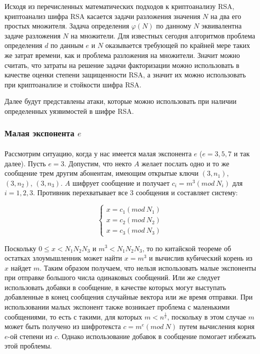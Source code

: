   Исходя из перечисленных математических подходов к криптоанализу RSA, криптоанализ шифра RSA касается задачи разложения значения $N$ на два его простых множителя. 
  Задача определения $\varphi(N)$ по данному $N$ эквивалентна задаче разложения $N$ на множители. Для известных сегодня алгоритмов
  проблема определения $d$ по данным $e$ и $N$ оказывается требующей по крайней мере таких же затрат времени, как и проблема разложения на 
  множители. Значит можно считать, что затраты на решение задачи факторизации можно использовать в качестве оценки степени защищенности RSA, а значит их можно использовать 
  при криптоанализе и стойкости шифра RSA.

  Далее будут представлены атаки, которые можно использовать при наличии определенных уязвимостей в шифре RSA. 

\subsubsection{Малая экспонента $e$}

  \paragraph{} Рассмотрим ситуацию, когда у нас имеется малая экспонента $e$ ($e = 3,5,7$ и так далее). Пусть $e=3$. Допустим, что некто
  $A$ желает послать одно и то же сообщение трем другим абонентам, имеющим открытые ключи $(3, n_1)$, $(3, n_2)$, $(3, n_3)$. $A$ шифрует 
  сообщение и получает $c_i = m^3(mod \: N_i)$ для $i = 1, 2, 3$. Противник перехватывает все 3 сообщения и составляет систему:
  
    \begin{equation}
    	\begin{cases}
    	   x = c_1(mod \: N_1) \\
    	   x = c_2(mod \: N_2) \\
    	   x = c_3(mod \: N_3)
    	\end{cases}    
    \end{equation}

  Поскольку $0 \le x < N_1 N_2 N_3$ и $m^3 < N_1 N_2 N_3$, то по китайской теореме об остатках злоумышленник может найти 
  $x = m^3$ и вычислив кубический корень из $x$ найдет $m$. Таким образом получаем, что нельзя использовать малые экспоненты 
  при отправке большого числа одинаковых сообщений. Или же следует использовать добавки в сообщение, в качестве которых могут выступать добавленные в 
  конец сообщения случайные вектора или же время отправки. При использовании малых экспонент также возникает проблема с маленькими сообщениями, то есть 
  с такими, для которых $m < n^{\frac{1}{e}}$, поскольку в этом случае $m$ может быть получено из шифротекста 
  $c = m^e(mod \: N)$ путем вычисления корня $e$-ой степени из $c$. Однако использование добавок в сообщение помогает избежать этой 
  проблемы.

